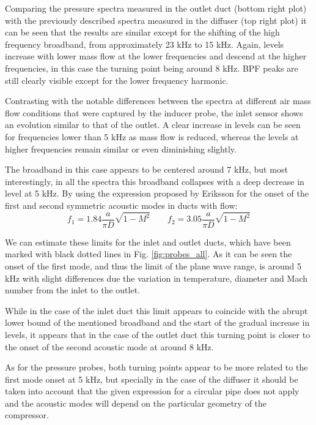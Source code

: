 Comparing the pressure spectra measured in the outlet duct (bottom right plot) with the previously described spectra measured in the diffuser (top right plot) it can be seen that the results are similar except for the shifting of the high frequency broadband, from approximately 23 kHz to 15 kHz. Again, levels increase with lower mass flow at the lower frequencies and descend at the higher frequencies, in this case the turning point being around 8 kHz. BPF peaks are still clearly visible except for the lower frequency harmonic.

Contrasting with the notable differences between the spectra at different air mass flow conditions that were captured by the inducer probe, the inlet sensor shows an evolution similar to that of the outlet. A clear increase in levels can be seen for frequencies lower than 5 kHz as mass flow is reduced, whereas the levels at higher frequencies remain similar or even diminishing slightly.

The broadband in this case appears to be centered around 7 kHz, but most interestingly, in all the spectra this broadband collapses with a deep decrease in level at 5 kHz. By using the expression proposed by Eriksson \cite{eriksson1980higher} for the onset of the first and second symmetric acoustic modes in ducts with flow:
\begin{equation}
  f_{1} = 1.84 \frac{a}{\pi D}\sqrt{1-M^2}\qquad f_{2} = 3.05 \frac{a}{\pi D}\sqrt{1-M^2}
\end{equation}

We can estimate these limits for the inlet and outlet ducts, which have been marked with black dotted lines in Fig. \ref{fig:probes_all}. As it can be seen the onset of the first mode, and thus the limit of the plane wave range, is around 5 kHz with slight differences due the variation in temperature, diameter and Mach number from the inlet to the outlet.

While in the case of the inlet duct this limit appears to coincide with the abrupt lower bound of the mentioned broadband and the start of the gradual increase in levels, it appears that in the case of the outlet duct this turning point is closer to the onset of the second acoustic mode at around 8 kHz. 

As for the pressure probes, both turning points appear to be more related to the first mode onset at 5 kHz, but specially in the case of the diffuser it should be taken into account that the given expression for a circular pipe does not apply and the acoustic modes will depend on the particular geometry of the compressor.

